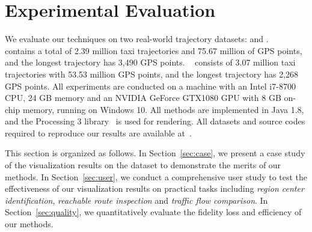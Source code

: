 \section{Experimental Evaluation}\label{sec:exp}
We evaluate our techniques on two real-world trajectory datasets: \pt{} and \sz{}.
\pt{}~\cite{pt} contains a total of 2.39 million taxi trajectories and 75.67 million of GPS points, and the longest trajectory has 3,490 GPS points.
\sz{}~\cite{sz} consists of 3.07 million taxi trajectories with 53.53 million GPS points, and the longest trajectory has 2,268 GPS points. All experiments are conducted on a machine with an Intel i7-8700 CPU, 24 GB memory and an NVIDIA GeForce GTX1080 GPU with 8 GB on-chip memory, running on Windows 10. All methods are implemented in Java 1.8, and the Processing 3 library~\cite{p3} is used for rendering. All datasets and source codes required to reproduce our results are available at~\cite{code}.

This section is organized as follows. In Section~\ref{sec:case}, we present a case study of the visualization results on the \pt{} dataset to demonstrate the merits of our methods. In Section~\ref{sec:user}, we conduct a comprehensive user study to test the effectiveness of our visualization results on practical  tasks including \textit{region center identification}, \textit{reachable route inspection} and \textit{traffic flow comparison}. In Section~\ref{sec:quality}, we quantitatively evaluate the fidelity loss and efficiency of our methods.


